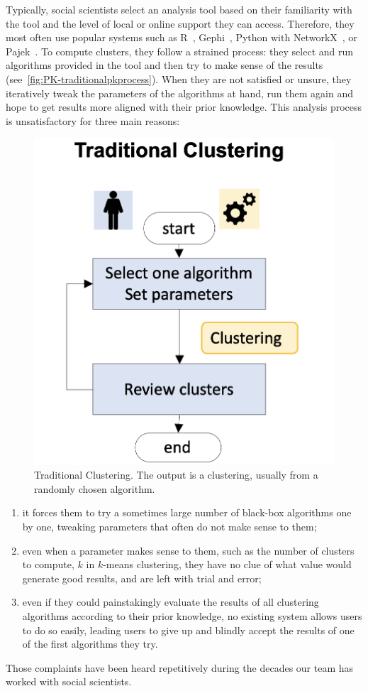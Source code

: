 Typically, social scientists select an analysis tool based on their familiarity with the tool and the level of local or online support they can access.
Therefore, they most often use popular systems such as R~\cite{Rstat}, Gephi~\cite{gephi}, Python with NetworkX~\cite{networkx}, or Pajek~\cite{pajek}.
To compute clusters, they follow a strained process: they select and run algorithms provided in the tool and then try to make sense of the results (see~\autoref{fig:PK-traditionalpkprocess}).
When they are not satisfied or unsure, they iteratively tweak the parameters of the algorithms at hand, run them again and hope to get results more aligned with their prior knowledge. This analysis process is unsatisfactory for three main reasons:
\begin{figure}
    \includegraphics[width=0.5\columnwidth]{static/figures/PK-Clustering/VISPaperFigures/traditionalclustering.png}
    \caption{Traditional Clustering.  The output is a clustering, usually from a randomly chosen algorithm.}
    \label{fig:PK-traditionalpkprocess}
\end{figure}
\begin{enumerate}[left=0pt .. \parindent,nosep]
    \item it forces them to try a sometimes large number of black-box algorithms one by one, tweaking parameters that often do not make sense to them; \item even when a parameter makes sense to them, such as the number of clusters to compute, $k$ in $k$-means clustering, they have no clue of what value would generate good results, and are left with trial and error;
    \item even if they could %
    painstakingly evaluate the results of all clustering algorithms  according to their prior knowledge, no existing system allows users to do so easily, leading users to give up and blindly accept the results of one of the first algorithms they try.
\end{enumerate}
Those complaints have been heard repetitively during the decades our team has worked with social scientists.


